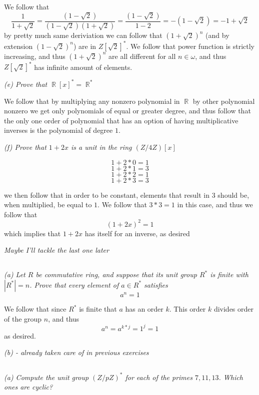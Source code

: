 \documentclass[11pt,oneside,titlepage]{book}
\DeclareMathOperator \real {\mathbb {R}}
\begin{document}
We follow that
$$\frac{1}{1 + \sqrt{2}} =
\frac{(1 - \sqrt{2})}{(1 - \sqrt{2})(1 + \sqrt{2})} =
\frac{(1 - \sqrt{2})}{1 - 2} = -(1 - \sqrt{2}) = -1 + \sqrt{2}$$ by
pretty much same deriviation we can follow that $(1 + \sqrt{2})^n$
(and by extension $(1 - \sqrt{2})^n$) are in $Z[\sqrt{2}]^*$.
We follow that power function is strictly increasing, and thus
$(1 + \sqrt{2})^n$ are all different for all $n \in \omega$, and
thus $Z[\sqrt{2}]^*$ has infinite amount of elements.

\textit{(e) Prove that $\real[x]^* = \real^*$}

We follow that by multiplying any nonzero polynomial in $\real$ by
other polynomial nonzero we get only polynomials of equal or greater
degree, and thus follow that the only one order of polynomial that
has an option of having multiplicative inverses is the polynomial of
degree $1$.

\textit{(f) Prove that $1 + 2x$ is a unit in the ring $(Z/4Z)[x]$ }

$$1 + 2 * 0 = 1$$
$$1 + 2 * 1 = 3$$
$$1 + 2 * 2 = 1$$
$$1 + 2 * 3 = 3$$

we then follow that in order to be constant, elements that result in
$3$ should be, when multiplied, be equal to $1$. We follow that
$3 * 3 = 1$ in this case, and thus we follow that
$$(1 + 2x)^2 = 1$$
which implies that $1 + 2x$ has itself for an inverse, as desired

\textit{Maybe I'll tackle the last one later}

\subsection{}

\textit{(a) Let $R$ be commutative ring, and suppose that its unit
  group $R^*$ is finite with $|R^*| = n$. Prove that every element of $a
  \in R^*$ satisfies
  $$a^n = 1$$
}

We follow that since $R^*$ is finite that $a$ has an order $k$. This
order $k$ divides order of the group $n$, and thus
$$a^n = a^{k * j} = 1^j = 1$$
as desired.

\textit{(b) - already taken care of in previous exercises}

\subsection{}

\textit{(a) Compute the unit group $(Z/pZ)^*$ for each of the primes
  $7, 11, 13$. Which ones are cyclic? }
\end{document}
